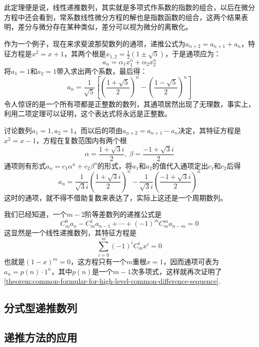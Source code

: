 此定理便是说，线性递推数列，其实就是多项式作系数的指数的组合，以后在微分方程中还会看到，常系数线性微分方程的解也是指数函数的组合，这两个结果表明，差分与微分存在某种类似，差分可以视为微分的离散化。

\begin{example}
作为一个例子，现在来求斐波那契数列的通项，递推公式为$a_{n+2}=a_{n+1}+a_n$，特征方程是$x^2=x+1$，其两个根是$x_{1,2}=\frac{1}{2}(1 \pm \sqrt{5})$，于是通项应为：
\[ a_n=\alpha _1 x_1^n+ \alpha _2 x_2^n \]
将$a_1=1$和$a_2=1$带入求出两个系数，最后得：
\[ a_n= \frac{1}{\sqrt{5}}\left[ \left( \frac{1+\sqrt{5}}{2} \right)^n - \left( \frac{1-\sqrt{5}}{2} \right)^n \right] \]
令人惊讶的是一个所有项都是正整数的数列，其通项居然出现了无理数，事实上，利用二项定理可以证明，这个表达式将永远是正整数。
\end{example}

\begin{example}
  讨论数列$a_1=1,a_2=1$，而以后的项由$a_{n+2}=a_{n+1}-a_n$决定，其特征方程是$x^2=x-1$，方程在复数范围内有两个根
  \[ \alpha = \frac{1+\sqrt{3}i}{2}, \  \beta = \frac{-1+\sqrt{3}i}{2} \]
  通项则有形式$a_n=c_1 \alpha^n + c_2 \beta^n$的形式，将$a_1$和$a_2$的值代入通项定出$c_1$和$c_2$后得
  \[ a_n = \frac{1}{\sqrt{3}i} \left( \frac{1+\sqrt{3}i}{2} \right)^{n} - \frac{1}{\sqrt{3}i} \left( \frac{-1+\sqrt{3}i}{2} \right)^n \]
 这时的通项，就不得不借助复数来表达了，实际上这还是一个周期数列。
\end{example}

\begin{example}
  我们已经知道，一个$m-2$阶等差数列的递推公式是
\[ C_m^0a_n-C_m^1a_{n-1}+\cdots+(-1)^mC_m^ma_{n-m} = 0 \]
这显然是一个线性递推数列，其特征方程是
\[ \sum_{i=0}^m(-1)^iC_m^ix^i = 0 \]
也就是$(1-x)^m = 0$，这方程只有一个$m$重根$x=1$，因而通项可表为$a_n=p(n) \cdot 1^n$，其中$p(n)$是一个$m-1$次多项式，这样就再次证明了\autoref{theorem:common-formular-for-high-level-common-difference-sequence}.
\end{example}



\subsection{分式型递推数列}
\label{sec:general-formular-of-frac-recursive-series}

\subsection{递推方法的应用}
\label{sec:application-of-recursive-method}

